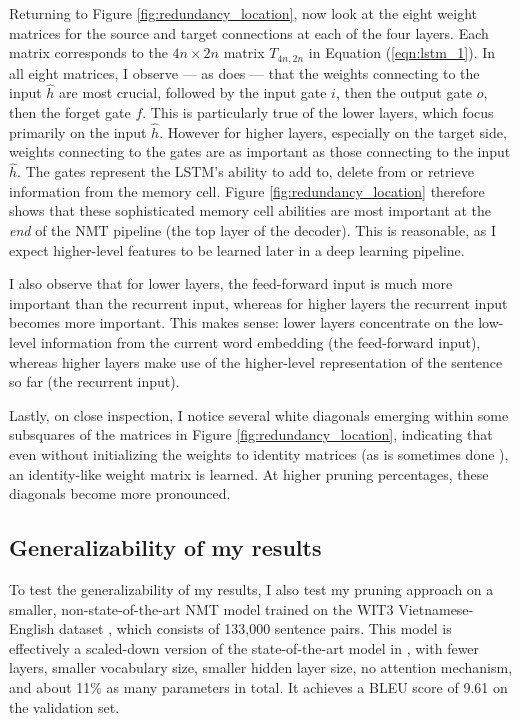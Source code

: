 Returning to Figure \ref{fig:redundancy_location}, now look at the eight weight matrices for the source and target connections at each of the four layers.
Each matrix corresponds to the $4n \times 2n$ matrix $T_{4n,2n}$ in Equation (\ref{eqn:lstm_1}).
In all eight matrices, I observe --- as does \cite{lu2016learning} --- that the weights connecting to the input $\hat{h}$ are most crucial, followed by the input gate $i$, then the output gate $o$, then the forget gate $f$. 
This is particularly true of the lower layers, which focus primarily on the input $\hat{h}$. 
However for higher layers, especially on the target side, weights connecting to the gates are as important as those connecting to the input $\hat{h}$.
The gates represent the LSTM's ability to add to, delete from or retrieve information from the memory cell.
Figure \ref{fig:redundancy_location} therefore shows that these sophisticated memory cell abilities are most important at the \emph{end} of the NMT pipeline (the top layer of the decoder).
This is reasonable, as I expect higher-level features to be learned later in a deep learning pipeline.

I also observe that for lower layers, the feed-forward input is much more important than the recurrent input, whereas for higher layers the recurrent input becomes more important.
This makes sense: lower layers concentrate on the low-level information from the current word embedding (the feed-forward input), whereas higher layers make use of the higher-level representation of the sentence so far (the recurrent input).

Lastly, on close inspection, I notice several white diagonals emerging within
some subsquares of the matrices in Figure \ref{fig:redundancy_location},
indicating that even without initializing the weights to identity matrices
(as is sometimes done \cite{le2015simple}),
an identity-like weight matrix is learned. At higher pruning percentages, these diagonals become more pronounced.

\subsection{Generalizability of my results}
To test the generalizability of my results, I also test my pruning approach
on a smaller, non-state-of-the-art NMT model trained on the WIT3 Vietnamese-English 
dataset \cite{iwslt15}, which consists of 133,000 sentence pairs.
This model is effectively a scaled-down version of the state-of-the-art model in \cite{luong15attn},
with fewer layers, smaller vocabulary size, smaller hidden layer size, no attention mechanism,
and about 11\% as many parameters in total.
It achieves a BLEU score of 9.61 on the validation set.

